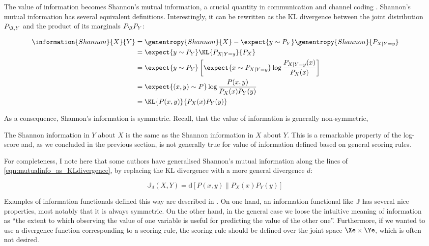 The value of information becomes Shannon's mutual information, a crucial quantity in communication and channel coding \citep{Shannon1948, MacKay2002}. Shannon's mutual information has several equivalent definitions. Interestingly, it can be rewritten as the KL divergence between the joint distribution $P_{\X,Y}$ and the product of its marginals $P_{\X}P_{Y}$:

\begin{align}
	\information{Shannon}{X}{Y} &= \genentropy{Shannon}{X} - \expect{y \sim P_{Y}} \genentropy{Shannon}{P_{X\vert Y=y}}\\
		&= \expect{y \sim P_{Y}}\KL{P_{X\vert Y=y}}{P_X}\\
		&= \expect{y \sim P_{Y}}\left[\expect{x \sim P_{X\vert Y=y}} \log\frac{P_{X\vert Y=y}(x)}{P_X(x)} \right]\\
		&= \expect{(x,y) \sim P} \log \frac{P(x,y)}{P_{X}(x)P_{Y}(y)}\\
		&= \KL{P(x,y)}{P_{X}(x)P_{Y}(y)}\label{eqn:mutualinfo_as_KLdivergence}
\end{align}

As a consequence, Shannon's information is symmetric. Recall, that the value of information is generally non-symmetric, 

The Shannon information in $Y$ about $X$ is the same as the Shannon information in $X$ about $Y$. This is a remarkable property of the log-score and, as we concluded in the previous section, is not generally true for value of information defined based on general scoring rules.

For completeness, I note here that some authors have generalised Shannon's mutual information along the lines of \eqref{eqn:mutualinfo_as_KLdivergence}, by replacing the KL divergence with a more general divergence $d$:

\begin{equation}
	\mathbb{J}_{d}(X,Y) = \mbox{d}\left[ P(x,y) \middle\| P_{X}(x)P_{Y}(y) \right]\label{eqn:mutualinfo_generalisations}
\end{equation}

Examples of information functionals defined this way are described in \citep{Poczos2011}.
On one hand, an information functional like $\mathbb{J}$ has several nice properties, most notably that it is always symmetric. On the other hand, in the general case we loose the intuitive meaning of information as ``the extent to which observing the value of one variable is useful for predicting the value of the other one''. Furthermore, if we wanted to use a divergence function corresponding to a scoring rule, the scoring rule should be defined over the joint space $\Xe\times\Ye$, which is often not desired.


